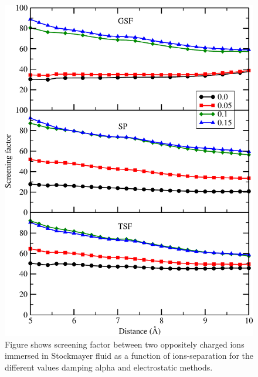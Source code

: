 \begin{figure}
  \centering
  \includegraphics[width=\linewidth]{ScreeningFactor_Dipole.pdf}
\caption{Figure shows screening factor between two oppositely charged ions immersed in Stockmayer fluid as a function of ions-separation for the different values damping alpha and electrostatic methods.}
\label{fig:ScreeningFactor_Dipole}
\end{figure}

